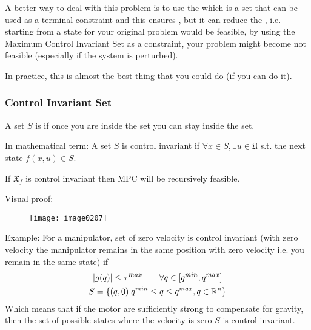 A better way to deal with this problem is to use the  which is a set that can be used as a terminal constraint and this ensures , but it can reduce the , i.e. starting from a state for your original problem would be feasible, by using the Maximum Control Invariant Set as a constraint, your problem might become not feasible (especially if the system is perturbed).

In practice, this is almost the best thing that you could do (if you can do it).

\subsubsection{Control Invariant Set}
A set $S$ is  if once you are inside the set you can stay inside the set.

In mathematical term:
A set $S$ is control invariant if $\forall x \in S, \exists u\in \mathfrak{U}$ s.t. the next state $f(x,u)\in S$.

\begin{theorem}
If $\mathfrak{X}_f$ is control invariant then MPC will be recursively feasible.
\end{theorem}
Visual proof:
\begin{figure}[!h]
\centering
\texttt{[image: image0207]}
\end{figure}

Example:
For a manipulator, set of zero velocity is control invariant (with zero velocity the manipulator remains in the same position with zero velocity i.e. you remain in the same state) if 
\begin{gather*}
\lvert g(q)\rvert\le \tau^{max}\qquad\forall q \in[q^{min},q^{max}]\\
S=\{(q,0)|q^{min}\le q\le q^{max}, q\in\mathbb{R}^n\}
\end{gather*}
Which means that if the motor are sufficiently strong to compensate for gravity, then the set of possible states where the velocity is zero $S$ is control invariant.

